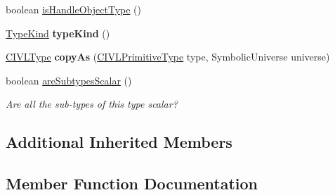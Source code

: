 \begin{DoxyCompactItemize}
\item 
boolean \hyperlink{classedu_1_1udel_1_1cis_1_1vsl_1_1civl_1_1model_1_1common_1_1type_1_1CommonHeapType_a0f9528e9f3644283b6c37c0faea45ccd}{is\+Handle\+Object\+Type} ()
\item 
\hypertarget{classedu_1_1udel_1_1cis_1_1vsl_1_1civl_1_1model_1_1common_1_1type_1_1CommonHeapType_a4c7440901d2837f6a2e026d8ca6b4dcf}{}\hyperlink{enumedu_1_1udel_1_1cis_1_1vsl_1_1civl_1_1model_1_1IF_1_1type_1_1CIVLType_1_1TypeKind}{Type\+Kind} {\bfseries type\+Kind} ()\label{classedu_1_1udel_1_1cis_1_1vsl_1_1civl_1_1model_1_1common_1_1type_1_1CommonHeapType_a4c7440901d2837f6a2e026d8ca6b4dcf}

\item 
\hypertarget{classedu_1_1udel_1_1cis_1_1vsl_1_1civl_1_1model_1_1common_1_1type_1_1CommonHeapType_a1bb9252d63e8166a29d44efecd32c7f7}{}\hyperlink{interfaceedu_1_1udel_1_1cis_1_1vsl_1_1civl_1_1model_1_1IF_1_1type_1_1CIVLType}{C\+I\+V\+L\+Type} {\bfseries copy\+As} (\hyperlink{interfaceedu_1_1udel_1_1cis_1_1vsl_1_1civl_1_1model_1_1IF_1_1type_1_1CIVLPrimitiveType}{C\+I\+V\+L\+Primitive\+Type} type, Symbolic\+Universe universe)\label{classedu_1_1udel_1_1cis_1_1vsl_1_1civl_1_1model_1_1common_1_1type_1_1CommonHeapType_a1bb9252d63e8166a29d44efecd32c7f7}

\item 
boolean \hyperlink{classedu_1_1udel_1_1cis_1_1vsl_1_1civl_1_1model_1_1common_1_1type_1_1CommonHeapType_aac2bee5a34bbf35b9ad06b8ad74bde3d}{are\+Subtypes\+Scalar} ()
\begin{DoxyCompactList}\small\item\em Are all the sub-\/types of this type scalar? \end{DoxyCompactList}\end{DoxyCompactItemize}
\subsection*{Additional Inherited Members}


\subsection{Member Function Documentation}
\hypertarget{classedu_1_1udel_1_1cis_1_1vsl_1_1civl_1_1model_1_1common_1_1type_1_1CommonHeapType_aac2bee5a34bbf35b9ad06b8ad74bde3d}{}
